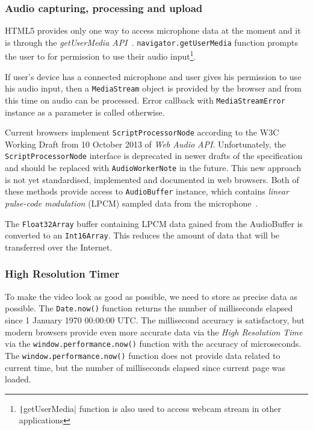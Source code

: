 \subsubsection{Audio capturing, processing and upload}

HTML5 provides only one way to access microphone data at the moment and it is through the \textit{getUserMedia API}~\cite{get_user_media}. \verb|navigator.getUserMedia| function prompts the user to for permission to use their audio input\footnote{\texttt|getUserMedia| function is also used to access webcam stream in other applications}.

If user's device has a connected microphone and user gives his permission to use his audio input, then a \verb|MediaStream| object is provided by the browser and from this time on audio can be processed. Error callback with \verb|MediaStreamError| instance as a parameter is called otherwise.

Current browsers implement \verb|ScriptProcessorNode| according to the W3C Working Draft from 10 October 2013 of \textit{Web Audio API}. Unfortunately, the \verb|ScriptProcessorNode| interface is deprecated in newer drafts of the specification and should be replaced with \verb|AudioWorkerNote| in the future\cite{mic_deprecated}. This new approach is not yet standardised, implemented and documented in web browsers. Both of these methods provide access to \verb|AudioBuffer| instance, which contains \textit{linear pulse-code modulation} (LPCM)\cite{wiki_pcm} sampled data from the microphone~\cite{mic_pcm}.

The \verb|Float32Array| buffer containing LPCM data gained from the AudioBuffer is converted to an \verb|Int16Array|. This reduces the amount of data that will be transferred over the Internet.



\subsubsection{High Resolution Timer}
To make the video look as good as possible, we need to store as precise data as possible. The \verb|Date.now()| function returns the number of milliseconds elapsed since 1 January 1970 00:00:00 UTC. The millisecond accuracy is satisfactory, but modern browsers provide even more accurate data via the \textit{High Resolution Time} via the \verb|window.performance.now()| function with the accuracy of microseconds. The \verb|window.performance.now()| function does not provide data related to current time, but the number of milliseconds elapsed since current page was loaded.

